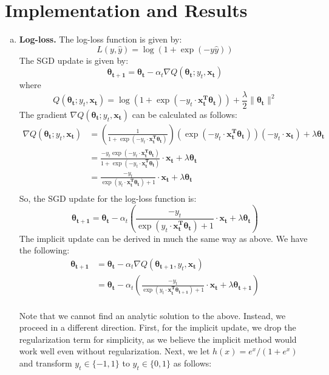 \documentclass{article}
\renewcommand{\vec}[1]{\boldsymbol{#1}}
\begin{document}
\section{Implementation and Results}

\begin{enumerate}[(a)]
\item \textbf{Log-loss.} The log-loss function is given by:
\begin{equation}
L(y, \hat{y}) = \log(1+\exp(-y\hat{y}))
\end{equation}
The SGD update is given by:
\begin{equation}
\vec{\theta_{t+1}} = \vec{\theta_{t}} - \alpha_{t}\nabla Q(\vec{\theta_{t}}; y_t, \vec{x_t})
\end{equation}
where
\begin{equation}
Q(\vec{\theta_{t}}; y_t, \vec{x_t}) = \log\left(1+\exp(-y_t\cdot\vec{x_t^{T}}\vec{\theta_t})\right) + \frac{\lambda}{2}\|\vec{\theta_t}\|^2
\end{equation}
The gradient $\nabla Q(\vec{\theta_{t}}; y_t, \vec{x_t})$ can be calculated as follows:
\begin{align*}
\nabla Q(\vec{\theta_{t}}; y_t, \vec{x_t}) &= \left(\frac{1}{1+\exp(-y_t\cdot\vec{x_t^{T}}\vec{\theta_t})} \right)\left(\exp(-y_t\cdot\vec{x_t	^{T}}\vec{\theta_t})\right)\left(-y_t\cdot\vec{x_t}\right) + \lambda\vec{\theta_t}\\
&= \frac{-y_t\exp(-y_t\cdot\vec{x_t^{T}}\vec{\theta_t})}{1+\exp(-y_t\cdot\vec{x_t^{T}}\vec{\theta_t})}\cdot\vec{x_t} + \lambda\vec{\theta_t}\\
&= \frac{-y_t}{\exp(y_t\cdot\vec{x_t^{T}}\vec{\theta_t})+1}\cdot\vec{x_t} + \lambda\vec{\theta_t}\\
\end{align*}
So, the SGD update for the log-loss function is:
\begin{equation}
\vec{\theta_{t+1}} = \vec{\theta_{t}} - \alpha_{t}\left( \frac{-y_t}{\exp(y_t\cdot\vec{x_t^{T}}\vec{\theta_t})+1}\cdot\vec{x_t} + \lambda\vec{\theta_t} \right)
\end{equation}
The implicit update can be derived in much the same way as above. We have the following:
\begin{align*}
\vec{\theta_{t+1}} &= \vec{\theta_t} - \alpha_t \nabla Q(\vec{\theta_{t+1}}, y_t, \vec{x_t})\\
&= \vec{\theta_t} - \alpha_t \left(\frac{-y_t}{\exp(y_t\cdot\vec{x_t^{T}}\vec{\theta_{t+1}})+1}\cdot\vec{x_t} + \lambda\vec{\theta_{t+1}} \right)
\end{align*}\\
Note that we cannot find an analytic solution to the above. Instead, we proceed in a different direction. First, for the implicit update, we drop the regularization term for simplicity, as we believe the implicit method would work well even without regularization. Next, we let $h(x) = e^{x} / (1+e^{x})$ and transform $y_t\in\{-1, 1\}$ to $y_t\in\{0, 1\}$ as follows: 


\end{enumerate}
\end{document}

